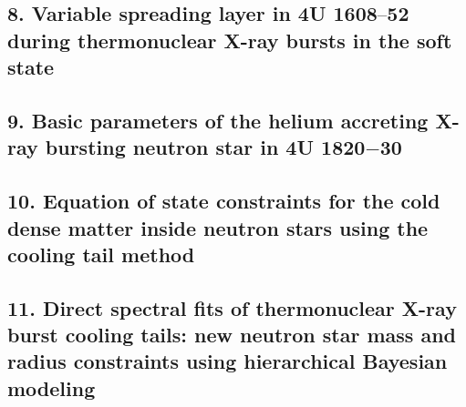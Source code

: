 \subsection*{8. Variable spreading layer in 4U 1608$–$52 during thermonuclear X-ray bursts in the soft state}

\subsection*{9. Basic parameters of the helium accreting X-ray bursting neutron star in 4U 1820$-$30}

\subsection*{10. Equation of state constraints for the cold dense matter inside neutron stars using the cooling tail method}

\subsection*{11. Direct spectral fits of thermonuclear X-ray burst cooling tails: new neutron star mass and radius constraints using hierarchical Bayesian modeling} 


